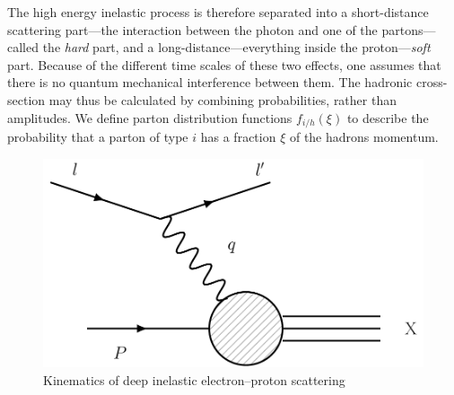 The high energy inelastic process is therefore separated into a short-distance scattering part---the interaction between the photon and one of the partons---called the \emph{hard} part, and a long-distance---everything inside the proton---\emph{soft} part. Because of the different time scales of these two effects, one assumes that there is no quantum mechanical interference between them. The hadronic cross-section may thus be calculated by combining probabilities, rather than amplitudes. We define parton distribution functions $f_{i/h}(\xi)$ to describe the probability that a parton of type $i$ has a fraction $\xi$ of the hadrons momentum. 

\begin{figure}
    \centering
    \includegraphics[scale=0.4]{Figures/DIS.pdf}
    \caption{Kinematics of deep inelastic electron--proton scattering}
    \label{fig:Deep Inelastic Scattering}
\end{figure}
\medskip

